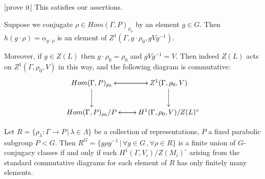 [prove it] This satisfies our assertions.

Suppose we conjugate $\rho\in Hom(\Gamma, P)_{\rho_0}$ by an element $g\in G$. Then $h(g\cdot\rho) = \alpha_{g\cdot\rho}$ is an element of $Z^1(\Gamma, g\cdot\rho_0, gVg^{-1})$. 

Moreover, if $g\in Z(L)$ then $g\cdot\rho_0 = \rho_0$ and $gVg^{-1} = V$. Then indeed $Z(L)$ acts on $Z^1(\Gamma, \rho_0, V)$ in this way, and the following diagram is commutative:
\begin{displaymath}
	\xymatrix{
		Hom(\Gamma, P)_{\rho_0} \ar[r] \ar[d] & Z^1(\Gamma, \rho_0, V) \ar[l]\ar[d] \\
		Hom(\Gamma, P)_{\rho_0}/P \ar[r] & H^1(\Gamma, \rho_0, V)/Z(L)^\circ \ar[l].
	}
\end{displaymath}


\begin{lemma}\label{PConjIsHOne} Let $R=\{\rho_\lambda:\Gamma\rightarrow P\, |\, \lambda \in \Lambda\}$ be a collection of representations, $P$ a fixed parabolic subgroup $P<G$. Then $R^G = \{g\rho g^{-1}\,|\,\forall g\in G\, ,\forall\rho\in R\}$ is a finite union of $G$-conjugacy classes if and only if each $H^1(\Gamma, V_i)/Z(M_i)^\circ$ arising from the standard commutative diagrams for each element of $R$ has only finitely many elements.
\end{lemma}
